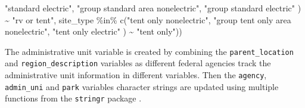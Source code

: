 \documentclass[
]{book}
\newenvironment{Shaded}{\begin{snugshade}}{\end{snugshade}}
\newcommand{\FunctionTok}[1]{\textcolor[rgb]{0.00,0.00,0.00}{#1}}
\newcommand{\NormalTok}[1]{#1}
\newcommand{\SpecialCharTok}[1]{\textcolor[rgb]{0.00,0.00,0.00}{#1}}
\newcommand{\StringTok}[1]{\textcolor[rgb]{0.31,0.60,0.02}{#1}}
\begin{document}
\begin{Shaded}
\begin{Highlighting}[]
                          \StringTok{"standard electric"}\NormalTok{, }\StringTok{"group standard area nonelectric"}\NormalTok{,}
                          \StringTok{"group standard electric"}
\NormalTok{         ) }\SpecialCharTok{\textasciitilde{}} \StringTok{"rv or tent"}\NormalTok{,}
\NormalTok{         site\_type }\SpecialCharTok{\%in\%} \FunctionTok{c}\NormalTok{(}\StringTok{"tent only nonelectric"}\NormalTok{, }\StringTok{"group tent only area nonelectric"}\NormalTok{,}
                          \StringTok{"tent only electric"}
\NormalTok{         ) }\SpecialCharTok{\textasciitilde{}} \StringTok{"tent only"}\NormalTok{))}
\end{Highlighting}
\end{Shaded}

The administrative unit variable is created by combining the \texttt{parent\_location} and \texttt{region\_description} variables as different federal agencies track the administrative unit information in different variables. Then the \texttt{agency}, \texttt{admin\_uni} and \texttt{park} variables character strings are updated using multiple functions from the \texttt{stringr} package \citep{R-stringr}.
\end{document}
